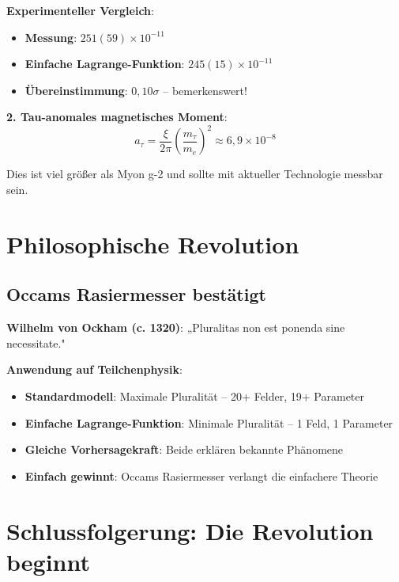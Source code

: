 \documentclass[12pt,a4paper]{article}
\newcommand{\xipar}{\xi}
\theoremstyle{definition}
\theoremstyle{remark}
\begin{document}
	\textbf{Experimenteller Vergleich}:
	\begin{itemize}
		\item \textbf{Messung}: $251(59) \times 10^{-11}$
		\item \textbf{Einfache Lagrange-Funktion}: $245(15) \times 10^{-11}$
		\item \textbf{Übereinstimmung}: $0{,}10\sigma$ -- bemerkenswert!
	\end{itemize}
	
	\textbf{2. Tau-anomales magnetisches Moment}:
	\begin{equation}
		a_{\tau} = \frac{\xipar}{2\pi} \left(\frac{m_{\tau}}{m_e}\right)^2 \approx 6{,}9 \times 10^{-8}
	\end{equation}
	
	Dies ist viel größer als Myon g-2 und sollte mit aktueller Technologie messbar sein.
	
	\section{Philosophische Revolution}
	
	\subsection{Occams Rasiermesser bestätigt}
	
	\begin{tcolorbox}[colback=blue!5!white,colframe=blue!75!black,title=Occams Rasiermesser in reiner Form]
		\textbf{Wilhelm von Ockham (c. 1320)}: „Pluralitas non est ponenda sine necessitate."
		
		\textbf{Anwendung auf Teilchenphysik}:
		\begin{itemize}
			\item \textbf{Standardmodell}: Maximale Pluralität -- 20+ Felder, 19+ Parameter
			\item \textbf{Einfache Lagrange-Funktion}: Minimale Pluralität -- 1 Feld, 1 Parameter
			\item \textbf{Gleiche Vorhersagekraft}: Beide erklären bekannte Phänomene
			\item \textbf{Einfach gewinnt}: Occams Rasiermesser verlangt die einfachere Theorie
		\end{itemize}
	\end{tcolorbox}
	
	\section{Schlussfolgerung: Die Revolution beginnt}
	
\end{document}
